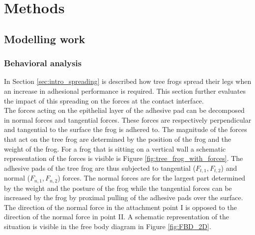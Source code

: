 \chapter{Methods}\label{ch:methods}
\section{Modelling work}
\subsection{Behavioral analysis}\label{sec:behavioral analysis}

\qquad In Section \ref{sec:intro_spreading} is described how tree frogs spread their legs when an increase in adhesional performance is required. This section further evaluates the impact of this spreading on the forces at the contact interface.\\

\qquad The forces acting on the epithelial layer of the adhesive pad can be decomposed in normal forces and tangential forces. These forces are respectively perpendicular and tangential to the surface the frog is adhered to. The magnitude of the forces that act on the tree frog are determined by the position of the frog and the weight of the frog. For a frog that is sitting on a vertical wall a schematic representation of the forces is visible is Figure \ref{fig:tree_frog_with_forces}. The adhesive pads of the tree frog are thus subjected to tangential ($F_{t,1}, F_{t,2}$) and normal ($F_{n,1}, F_{n,2}$) forces. The normal forces are for the largest part determined by the weight and the posture of the frog while the tangential forces can be increased by the frog by proximal pulling of the adhesive pads over the surface. The direction of the normal force in the attachment point I is opposed to the direction of the normal force in point II. A schematic representation of the situation is visible in the free body diagram in Figure \ref{fig:FBD_2D}.\\ 

